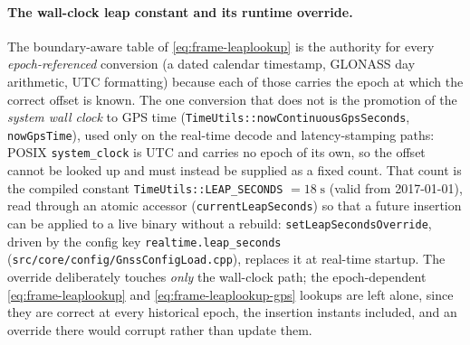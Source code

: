 \documentclass[main.tex]{subfiles}
\begin{document}
\paragraph{The wall-clock leap constant and its runtime override.}
The boundary-aware table of \eqref{eq:frame-leaplookup} is the authority
for every \emph{epoch-referenced} conversion (a dated calendar
timestamp, GLONASS day arithmetic, UTC formatting) because each of
those carries the epoch at which the correct offset is known.  The one
conversion that does not is the promotion of the \emph{system wall clock}
to GPS time (\texttt{TimeUtils::nowContinuousGpsSeconds},
\texttt{nowGpsTime}), used only on the real-time decode and
latency-stamping paths: POSIX \texttt{system\_clock} is UTC and carries no
epoch of its own, so the offset cannot be looked up and must instead be
supplied as a fixed count.  That count is the compiled constant
\texttt{TimeUtils::LEAP\_SECONDS} $= 18\;\mathrm{s}$ (valid from
2017-01-01), read through an atomic accessor
(\texttt{currentLeapSeconds}) so that a future insertion can be applied to
a live binary without a rebuild: \texttt{setLeapSecondsOverride}, driven
by the config key \texttt{realtime.leap\_seconds}
(\texttt{src/core/config/GnssConfigLoad.cpp}), replaces it at real-time
startup.  The override deliberately touches \emph{only} the wall-clock
path; the epoch-dependent \eqref{eq:frame-leaplookup} and
\eqref{eq:frame-leaplookup-gps} lookups are left alone, since they are
correct at every historical epoch, the insertion instants included, and
an override there would corrupt rather than update them.
\end{document}
